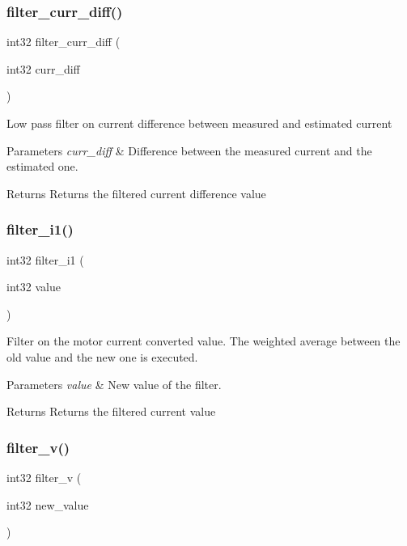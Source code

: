 \subsubsection{filter\+\_\+curr\+\_\+diff()}
{\footnotesize\ttfamily int32 filter\+\_\+curr\+\_\+diff (\begin{DoxyParamCaption}\item[{int32}]{curr\+\_\+diff }\end{DoxyParamCaption})}

Low pass filter on current difference between measured and estimated current


\begin{DoxyParams}{Parameters}
{\em curr\+\_\+diff} & Difference between the measured current and the estimated one.\\
\hline
\end{DoxyParams}
\begin{DoxyReturn}{Returns}
Returns the filtered current difference value 
\end{DoxyReturn}
\mbox{\label{utils_8c_ad3131df52849d030b02010f285481ba6}} 
\subsubsection{filter\+\_\+i1()}
{\footnotesize\ttfamily int32 filter\+\_\+i1 (\begin{DoxyParamCaption}\item[{int32}]{value }\end{DoxyParamCaption})}

Filter on the motor current converted value. The weighted average between the old value and the new one is executed.


\begin{DoxyParams}{Parameters}
{\em value} & New value of the filter.\\
\hline
\end{DoxyParams}
\begin{DoxyReturn}{Returns}
Returns the filtered current value 
\end{DoxyReturn}
\mbox{\label{utils_8c_af034fe9aa479d4adfc6e75e20b2f7ff3}} 
\subsubsection{filter\+\_\+v()}
{\footnotesize\ttfamily int32 filter\+\_\+v (\begin{DoxyParamCaption}\item[{int32}]{new\+\_\+value }\end{DoxyParamCaption})}

